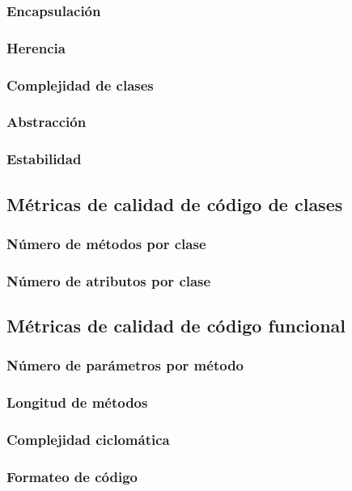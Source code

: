 \documentclass[11pt]{article}
\begin{document}
\subsubsection{Encapsulación}
\subsubsection{Herencia}
\subsubsection{Complejidad de clases}
\subsubsection{Abstracción}
\subsubsection{Estabilidad}

\subsection{Métricas de calidad de código de clases}
\subsubsection{Número de métodos por clase}
\subsubsection{Número de atributos por clase}

\subsection{Métricas de calidad de código funcional}
\subsubsection{Número de parámetros por método}
\subsubsection{Longitud de métodos}
\subsubsection{Complejidad ciclomática}
\subsubsection{Formateo de código}
\end{document}
